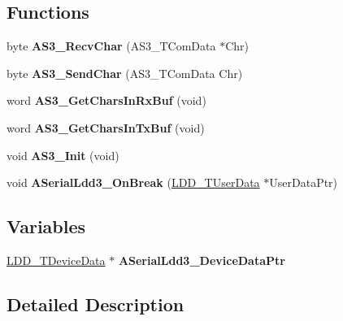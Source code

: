 \subsection*{Functions}
\begin{DoxyCompactItemize}
\item 
byte {\bfseries A\+S3\+\_\+\+Recv\+Char} (A\+S3\+\_\+\+T\+Com\+Data $\ast$Chr)\hypertarget{group___a_s3__module_ga97b9b68f57c72d7b1e650a1079a4918c}{}\label{group___a_s3__module_ga97b9b68f57c72d7b1e650a1079a4918c}

\item 
byte {\bfseries A\+S3\+\_\+\+Send\+Char} (A\+S3\+\_\+\+T\+Com\+Data Chr)\hypertarget{group___a_s3__module_ga9177e85b232bffbef4c8bcf9976c0370}{}\label{group___a_s3__module_ga9177e85b232bffbef4c8bcf9976c0370}

\item 
word {\bfseries A\+S3\+\_\+\+Get\+Chars\+In\+Rx\+Buf} (void)\hypertarget{group___a_s3__module_gabef3ec5939440281b68446b92ea04cac}{}\label{group___a_s3__module_gabef3ec5939440281b68446b92ea04cac}

\item 
word {\bfseries A\+S3\+\_\+\+Get\+Chars\+In\+Tx\+Buf} (void)\hypertarget{group___a_s3__module_ga55de5a47dcb2f912a212a3eabc5b6ea8}{}\label{group___a_s3__module_ga55de5a47dcb2f912a212a3eabc5b6ea8}

\item 
void {\bfseries A\+S3\+\_\+\+Init} (void)\hypertarget{group___a_s3__module_ga418bfd1a16f2a16c947e648f957b6b99}{}\label{group___a_s3__module_ga418bfd1a16f2a16c947e648f957b6b99}

\item 
void {\bfseries A\+Serial\+Ldd3\+\_\+\+On\+Break} (\hyperlink{group___p_e___types__module_ga0b66a73f87238a782318aa0be7578e35}{L\+D\+D\+\_\+\+T\+User\+Data} $\ast$User\+Data\+Ptr)\hypertarget{group___a_s3__module_gaaf3df8c9ce1709d69a92da6c9efa096a}{}\label{group___a_s3__module_gaaf3df8c9ce1709d69a92da6c9efa096a}

\end{DoxyCompactItemize}
\subsection*{Variables}
\begin{DoxyCompactItemize}
\item 
\hyperlink{group___p_e___types__module_gac5cf1362f1f0e3a2ce71b1bf2276d091}{L\+D\+D\+\_\+\+T\+Device\+Data} $\ast$ {\bfseries A\+Serial\+Ldd3\+\_\+\+Device\+Data\+Ptr}\hypertarget{group___a_s3__module_ga5ac1206ee6eb4b4a1b8c86a974469ef0}{}\label{group___a_s3__module_ga5ac1206ee6eb4b4a1b8c86a974469ef0}

\end{DoxyCompactItemize}


\subsection{Detailed Description}
